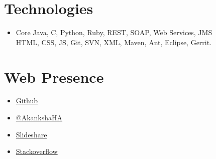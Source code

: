 \documentclass[margin,line]{res}
\begin{document}
\begin{resume}
\begin{itemize}
 
\end{itemize}

\section{Technologies}
\begin{itemize} \itemsep -4pt
\item Core Java, C, Python, Ruby, REST, SOAP, Web Services, JMS\\
HTML, CSS, JS, Git, SVN, XML, Maven, Ant, Eclipse, Gerrit.\\
\end{itemize}

\section{Web Presence}
\begin{itemize} \itemsep -4pt
\item \href{https://github.com/Akanksha08/}{Github}\\
\item \href{https://twitter.com/AkankshaHA}{@AkankshaHA}\\
\item \href{http://www.slideshare.net/akankshaaha/}{Slideshare}\\
\item \href{http://stackoverflow.com/users/4935809/akanksha-agrawal}{Stackoverflow}\\
\end{itemize}


\end{resume}
\end{document}
